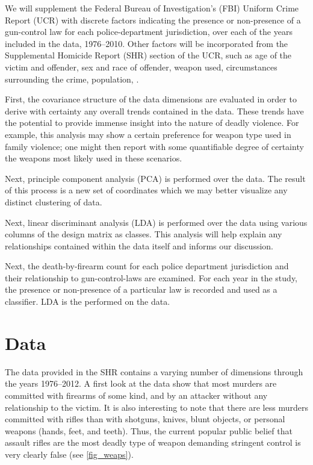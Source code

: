 \documentclass{evanarticle}
\begin{document}
We will supplement the Federal Bureau of Investigation's (FBI) Uniform Crime Report (UCR) \citep{shr} with discrete factors indicating the presence or non-presence of a gun-control law for each police-department jurisdiction, over each of the years included in the data, 1976--2010.
Other factors will be incorporated from the Supplemental Homicide Report (SHR) section of the UCR, such as age of the victim and offender, sex and race of offender, weapon used, circumstances surrounding the crime, population, \etc.

First, the covariance structure of the data dimensions are evaluated in order to derive with certainty any overall trends contained in the data.
These trends have the potential to provide immense insight into the nature of deadly violence.
For example, this analysis may show a certain preference for weapon type used in family violence; one might then report with some quantifiable degree of certainty the weapons most likely used in these scenarios.

Next, principle component analysis (PCA) \citep{sergios} is performed over the data.
The result of this process is a new set of coordinates which we may better visualize any distinct clustering of data.

Next, linear discriminant analysis (LDA) \citep{sergios} is performed over the data using various columns of the design matrix as classes.
This analysis will help explain any relationships contained within the data itself and informs our discussion.

Next, the death-by-firearm count for each police department jurisdiction and their relationship to gun-control-laws are examined.
For each year in the study, the presence or non-presence of a particular law is recorded and used as a classifier.
LDA is the performed on the data.

\section{Data} \label{sec_data}

The data provided in the SHR contains a varying number of dimensions through the years 1976--2012.
A first look at the data show that most murders are committed with firearms of some kind, and by an attacker without any relationship to the victim.
It is also interesting to note that there are less murders committed with rifles than with shotguns, knives, blunt objects, or personal weapons (hands, feet, and teeth).
Thus, the current popular public belief that assault rifles are the most deadly type of weapon demanding stringent control is very clearly false (see \cref{fig_weaps}).
\end{document}
